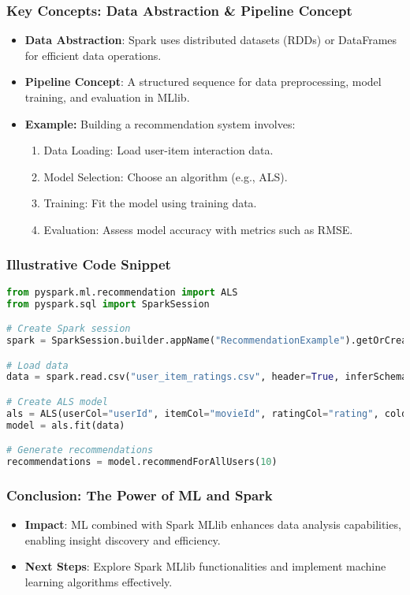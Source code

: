 \documentclass[aspectratio=169]{beamer}
\begin{document}
\begin{frame}[fragile]
    \frametitle{Key Concepts: Data Abstraction & Pipeline Concept}
    \begin{itemize}
        \item \textbf{Data Abstraction}: Spark uses distributed datasets (RDDs) or DataFrames for efficient data operations.
        \item \textbf{Pipeline Concept}: A structured sequence for data preprocessing, model training, and evaluation in MLlib.
        \item \textbf{Example:} Building a recommendation system involves:
        \begin{enumerate}
            \item Data Loading: Load user-item interaction data.
            \item Model Selection: Choose an algorithm (e.g., ALS).
            \item Training: Fit the model using training data.
            \item Evaluation: Assess model accuracy with metrics such as RMSE.
        \end{enumerate}
    \end{itemize}
\end{frame}

\begin{frame}[fragile]
    \frametitle{Illustrative Code Snippet}
    \begin{lstlisting}[language=Python]
from pyspark.ml.recommendation import ALS
from pyspark.sql import SparkSession

# Create Spark session
spark = SparkSession.builder.appName("RecommendationExample").getOrCreate()

# Load data
data = spark.read.csv("user_item_ratings.csv", header=True, inferSchema=True)

# Create ALS model
als = ALS(userCol="userId", itemCol="movieId", ratingCol="rating", coldStartStrategy="drop")
model = als.fit(data)

# Generate recommendations
recommendations = model.recommendForAllUsers(10)
    \end{lstlisting}
\end{frame}

\begin{frame}[fragile]
    \frametitle{Conclusion: The Power of ML and Spark}
    \begin{itemize}
        \item \textbf{Impact}: ML combined with Spark MLlib enhances data analysis capabilities, enabling insight discovery and efficiency.
        \item \textbf{Next Steps}: Explore Spark MLlib functionalities and implement machine learning algorithms effectively.
    \end{itemize}
\end{frame}
\end{document}
